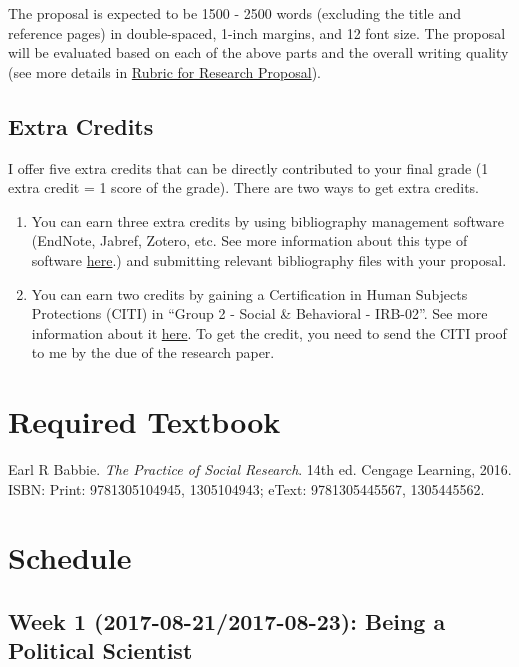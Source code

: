 \documentclass[11pt,]{article}
\theoremstyle{definition}
\theoremstyle{definition}
\theoremstyle{remark}
\begin{document}
The proposal is expected to be 1500 - 2500 words (excluding the title
and reference pages) in double-spaced, 1-inch margins, and 12 font size.
The proposal will be evaluated based on each of the above parts and the
overall writing quality (see more details in
\protect\hyperlink{id}{Rubric for Research Proposal}).

\subsection{Extra Credits}\label{extra-credits}

I offer five extra credits that can be directly contributed to your
final grade (1 extra credit = 1 score of the grade). There are two ways
to get extra credits.

\begin{enumerate}
\def\labelenumi{\arabic{enumi}.}
\item
  You can earn three extra credits by using bibliography management
  software (EndNote, Jabref, Zotero, etc. See more information about
  this type of software
  \href{https://en.wikipedia.org/wiki/Comparison_of_reference_management_software}{here}.)
  and submitting relevant bibliography files with your proposal.
\item
  You can earn two credits by gaining a Certification in Human Subjects
  Protections (CITI) in ``Group 2 - Social \& Behavioral - IRB-02''. See
  more information about it
  \href{https://hso.research.uiowa.edu/certifications-human-subjects-protections-citi}{here}.
  To get the credit, you need to send the CITI proof to me by the due of
  the research paper.
\end{enumerate}

\section{Required Textbook}\label{required-textbook}

Earl R Babbie. \emph{The Practice of Social Research}. 14th ed. Cengage
Learning, 2016. ISBN: Print: 9781305104945, 1305104943; eText:
9781305445567, 1305445562.

\section{Schedule}\label{schedule}

\subsection{Week 1 (2017-08-21/2017-08-23): Being a Political
Scientist}\label{week-1-2017-08-212017-08-23-being-a-political-scientist}
\end{document}
